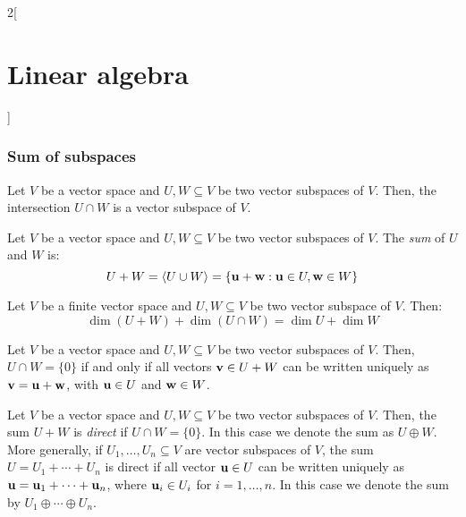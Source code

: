 \documentclass[../../../main.tex]{subfiles}
\begin{document}
\begin{multicols}{2}[\section{Linear algebra}]
  \subsubsection{Sum of subspaces}
  \begin{lemma}
    Let $V$ be a vector space and $U,W\subseteq V$ be two vector subspaces of $V$. Then, the intersection $U\cap W$ is a vector subspace of $V$.
  \end{lemma}
  \begin{definition}
    Let $V$ be a vector space and $U,W\subseteq V$ be two vector subspaces of $V$. The \emph{sum} of $U$ and $W$ is: $$U+W=\langle U\cup W\rangle=\{\boldsymbol{\mathrm{u}}+\boldsymbol{\mathrm{w}}: \boldsymbol{\mathrm{u}}\in U,\boldsymbol{\mathrm{w}}\in W\}$$
  \end{definition}
  \begin{proposition}
    Let $V$ be a finite vector space and $U,W\subseteq V$ be two vector subspace of $V$. Then: $$\dim (U+W)+\dim(U\cap W)=\dim U+\dim W$$
  \end{proposition}
  \begin{lemma}
    Let $V$ be a vector space and $U,W\subseteq V$ be two vector subspaces of $V$. Then, $U\cap W=\{0\}$ if and only if all vectors $\boldsymbol{\mathrm{v}}\in U+W$ can be written uniquely as $\boldsymbol{\mathrm{v}}=\boldsymbol{\mathrm{u}}+\boldsymbol{\mathrm{w}}$, with $\boldsymbol{\mathrm{u}}\in U$ and $\boldsymbol{\mathrm{w}}\in W$.
  \end{lemma}
  \begin{definition}
    Let $V$ be a vector space and $U,W\subseteq V$ be two vector subspaces of $V$. Then, the sum $U+W$ is \emph{direct} if $U\cap W=\{0\}$. In this case we denote the sum as $U\oplus W$. More generally, if $U_1,\ldots,U_n\subseteq V$ are vector subspaces of $V$, the sum $U=U_1+\cdots+U_n$ is direct if all vector $\boldsymbol{\mathrm{u}}\in U$ can be written uniquely as $\boldsymbol{\mathrm{u}}=\boldsymbol{\mathrm{u}}_1+\cdots+\boldsymbol{\mathrm{u}}_n$, where $\boldsymbol{\mathrm{u}}_i\in U_i$ for $i=1,\ldots,n$. In this case we denote the sum by $U_1\oplus\cdots\oplus U_n$.
  \end{definition}

\end{multicols}
\end{document}
